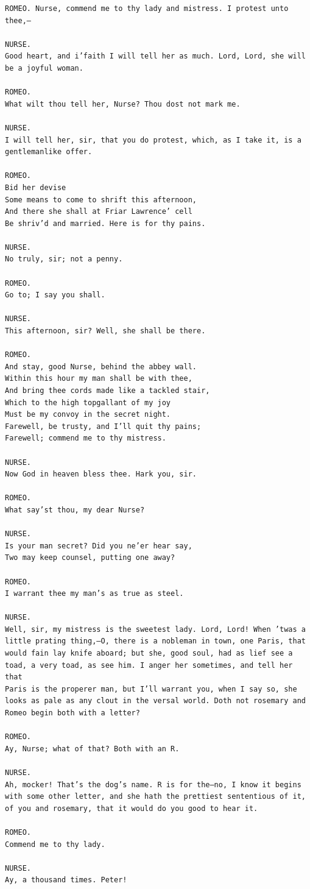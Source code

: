\documentclass{article}
\begin{document}
\begin{verbatim}
ROMEO. Nurse, commend me to thy lady and mistress. I protest unto
thee,—

NURSE.
Good heart, and i’faith I will tell her as much. Lord, Lord, she will
be a joyful woman.

ROMEO.
What wilt thou tell her, Nurse? Thou dost not mark me.

NURSE.
I will tell her, sir, that you do protest, which, as I take it, is a
gentlemanlike offer.

ROMEO.
Bid her devise
Some means to come to shrift this afternoon,
And there she shall at Friar Lawrence’ cell
Be shriv’d and married. Here is for thy pains.

NURSE.
No truly, sir; not a penny.

ROMEO.
Go to; I say you shall.

NURSE.
This afternoon, sir? Well, she shall be there.

ROMEO.
And stay, good Nurse, behind the abbey wall.
Within this hour my man shall be with thee,
And bring thee cords made like a tackled stair,
Which to the high topgallant of my joy
Must be my convoy in the secret night.
Farewell, be trusty, and I’ll quit thy pains;
Farewell; commend me to thy mistress.

NURSE.
Now God in heaven bless thee. Hark you, sir.

ROMEO.
What say’st thou, my dear Nurse?

NURSE.
Is your man secret? Did you ne’er hear say,
Two may keep counsel, putting one away?

ROMEO.
I warrant thee my man’s as true as steel.

NURSE.
Well, sir, my mistress is the sweetest lady. Lord, Lord! When ’twas a
little prating thing,—O, there is a nobleman in town, one Paris, that
would fain lay knife aboard; but she, good soul, had as lief see a
toad, a very toad, as see him. I anger her sometimes, and tell her that
Paris is the properer man, but I’ll warrant you, when I say so, she
looks as pale as any clout in the versal world. Doth not rosemary and
Romeo begin both with a letter?

ROMEO.
Ay, Nurse; what of that? Both with an R.

NURSE.
Ah, mocker! That’s the dog’s name. R is for the—no, I know it begins
with some other letter, and she hath the prettiest sententious of it,
of you and rosemary, that it would do you good to hear it.

ROMEO.
Commend me to thy lady.

NURSE.
Ay, a thousand times. Peter!


\end{verbatim}
\end{document}

